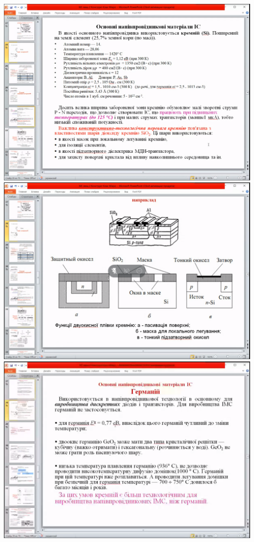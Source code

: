 \documentclass[a4paper,14pt]{extreport}
\begin{document}
\begin{center}
\includegraphics[scale = 0.75]{7.png}
\includegraphics[scale = 0.75]{8.png}
\includegraphics[scale = 0.75]{9.png}

\end{center}
\end{document}
